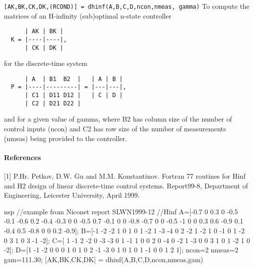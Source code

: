 \begin{mandescription}
  \verb![AK,BK,CK,DK,(RCOND)] = dhinf(A,B,C,D,ncon,nmeas, gamma)! 
  To compute the matrices of an H-infinity (sub)optimal n-state
  controller
\begin{verbatim}
      | AK | BK |
  K = |----|----|,
      | CK | DK |
\end{verbatim}
for the discrete-time system
\begin{verbatim}
      | A  | B1  B2  |   | A | B |
  P = |----|---------| = |---|---|,
      | C1 | D11 D12 |   | C | D | 
      | C2 | D21 D22 |
\end{verbatim}
and for a given value of gamma, where B2 has column size of the
number of control inputs (ncon) and C2 has row size of the number
of measurements (nmeas) being provided to the controller.
\end{mandescription}
\paragraph{References}
[1] P.Hr. Petkov, D.W. Gu and M.M. Konstantinov. Fortran 77 routines
for Hinf and H2 design of linear discrete-time control systems.
Report99-8, Department of Engineering, Leicester University, April 1999.
\begin{examples}
  \begin{mintednsp}{nsp}
    //example from Niconet report SLWN1999-12
    //Hinf
    A=[-0.7  0    0.3  0   -0.5 -0.1
      -0.6  0.2 -0.4 -0.3  0    0
      -0.5  0.7 -0.1  0    0   -0.8
      -0.7  0    0   -0.5 -1    0
      0    0.3  0.6 -0.9  0.1 -0.4
      0.5 -0.8  0    0    0.2 -0.9];
    B=[-1 -2 -2  1  0
      1  0  1 -2  1
      -3 -4  0  2 -2
      1 -2  1  0 -1
      0  1 -2  0  3
      1  0  3 -1 -2];
    C=[ 1 -1  2 -2  0 -3
      -3  0  1 -1  1  0
      0  2  0 -4  0 -2
      1 -3  0  0  3  1
      0  1 -2  1  0 -2];
    D=[1 -1 -2  0  0
      0  1  0  1  0
      2 -1 -3  0  1
      0  1  0  1 -1
      0  0  1  2  1];
    ncon=2
    nmeas=2
    gam=111.30;
    [AK,BK,CK,DK] = dhinf(A,B,C,D,ncon,nmeas,gam)
  \end{mintednsp}
\end{examples}
\begin{manseealso}
     
\end{manseealso}
